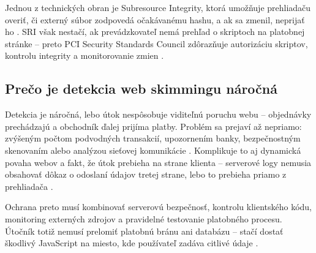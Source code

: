 Jednou z technických obran je Subresource Integrity, ktorá umožňuje prehliadaču overiť, či externý súbor zodpovedá očakávanému hashu, a ak sa zmenil, neprijať ho \cite{owaspSRI}. SRI však nestačí, ak prevádzkovateľ nemá prehľad o skriptoch na platobnej stránke -- preto PCI Security Standards Council zdôrazňuje autorizáciu skriptov, kontrolu integrity a monitorovanie zmien \cite{pciSsc2025PaymentPage}.

\subsection{Prečo je detekcia web skimmingu náročná}

Detekcia je náročná, lebo útok nespôsobuje viditeľnú poruchu webu -- objednávky prechádzajú a obchodník ďalej prijíma platby. Problém sa prejaví až nepriamo: zvýšeným počtom podvodných transakcií, upozornením banky, bezpečnostným skenovaním alebo analýzou sieťovej komunikácie \cite{cisa2020eskimming,pciSsc2025PaymentPage}. Komplikuje to aj dynamická povaha webov a fakt, že útok prebieha na strane klienta -- serverové logy nemusia obsahovať dôkaz o odoslaní údajov tretej strane, lebo to prebieha priamo z prehliadača \cite{owaspClientSideTop10}.

Ochrana preto musí kombinovať serverovú bezpečnosť, kontrolu klientského kódu, monitoring externých zdrojov a pravidelné testovanie platobného procesu. Útočník totiž nemusí prelomiť platobnú bránu ani databázu -- stačí dostať škodlivý JavaScript na miesto, kde používateľ zadáva citlivé údaje \cite{owaspThirdPartyJavascript,pciSsc2025PaymentPage}.
